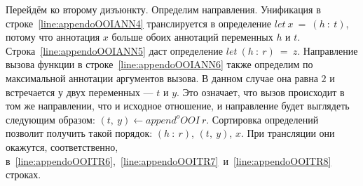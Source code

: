 Перейдём ко второму дизъюнкту.
Определим направления.
Унификация в строке~\ref{line:appendoOOIANN4} транслируется в определение $let~x~=~(h~:~t)$, потому что аннотация $x$ больше обоих аннотаций переменных $h$ и $t$.
Строка~\ref{line:appendoOOIANN5} даст определение $let~(h~:~r)~=~z$.
Направление вызова функции в строке~\ref{line:appendoOOIANN6} также определим по максимальной аннотации аргументов вызова.
В данном случае она равна $2$ и встречается у двух переменных --- $t$ и $y$.
Это означает, что вызов происходит в том же направлении, что и исходное отношение, и направление будет выглядеть следующим образом: $(t,~y) \gets append^oOOI~r$.
Сортировка определений позволит получить такой порядок: $(h~:~r)$, $(t,~y)$, $x$.
При трансляции они окажутся, соответственно, в~\ref{line:appendoOOITR6},~\ref{line:appendoOOITR7}~и~\ref{line:appendoOOITR8} строках.
